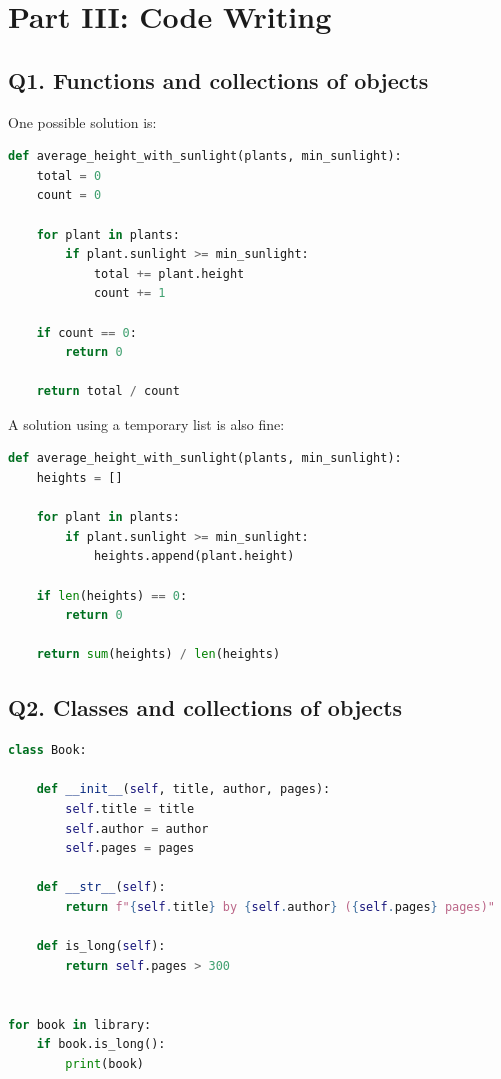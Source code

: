 \documentclass[12pt]{article}
\begin{document}
\section*{Part III: Code Writing}

\subsection*{Q1. Functions and collections of objects}

One possible solution is:

\begin{lstlisting}[language=Python]
def average_height_with_sunlight(plants, min_sunlight):
    total = 0
    count = 0

    for plant in plants:
        if plant.sunlight >= min_sunlight:
            total += plant.height
            count += 1

    if count == 0:
        return 0

    return total / count
\end{lstlisting}

A solution using a temporary list is also fine:

\begin{lstlisting}[language=Python]
def average_height_with_sunlight(plants, min_sunlight):
    heights = []

    for plant in plants:
        if plant.sunlight >= min_sunlight:
            heights.append(plant.height)

    if len(heights) == 0:
        return 0

    return sum(heights) / len(heights)
\end{lstlisting}

\subsection*{Q2. Classes and collections of objects}

\begin{lstlisting}[language=Python]
class Book:

    def __init__(self, title, author, pages):
        self.title = title
        self.author = author
        self.pages = pages

    def __str__(self):
        return f"{self.title} by {self.author} ({self.pages} pages)"

    def is_long(self):
        return self.pages > 300


for book in library:
    if book.is_long():
        print(book)
\end{lstlisting}
\end{document}
